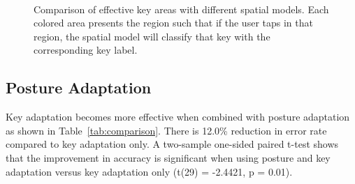 \documentclass{sigchi}
\begin{document}
\begin{figure}[tb]
  \centering
   ~
  \caption{Comparison of effective key areas with different spatial models.  Each colored area presents the region such that if the user taps in that region, the spatial model will classify that key with the corresponding key label.}
  \label{fig:key-boundary}
\end{figure}

\subsection{Posture Adaptation}
Key adaptation becomes more effective when combined with posture adaptation as
shown in Table~\ref{tab:comparison}. There is 12.0\% reduction in error rate 
compared to key adaptation only. A two-sample one-sided paired t-test shows
that the improvement in accuracy is significant when using posture and key 
adaptation versus key adaptation only (t(29) = -2.4421, p = 0.01).
\end{document}
